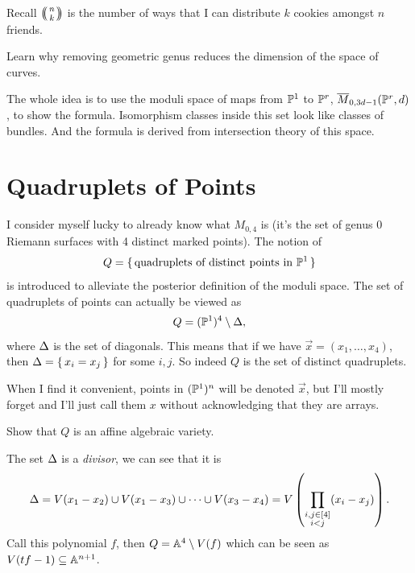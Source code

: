\documentclass[12pt]{memoir}
\begin{document}
\begin{Rmk}
    Recall $\multinom{n}{k}$ is the number of ways that I can distribute $k$ cookies amongst $n$ friends.
\end{Rmk}

\begin{Ej}
Learn why removing geometric genus reduces the dimension of the space of curves.
\end{Ej}

\begin{ptcb}
\end{ptcb}

The whole idea is to use the moduli space of maps from $\mathbb{P}^1$ to $\mathbb{P}^r$, $\overline M_{0,3d-1}(\mathbb{P}^r,d)$, to show the formula. Isomorphism classes inside this set look like classes of bundles. And the formula is derived from intersection theory of this space. 

\section{Quadruplets of Points}

I consider myself lucky to already know what $M_{0,4}$ is (it's the set of genus 0 Riemann surfaces with 4 distinct marked points). The notion of 
$$Q=\{\,\text{quadruplets of distinct points in }\mathbb{P}^1\,\}$$
is introduced to alleviate the posterior definition of the moduli space. The set of quadruplets of points can actually be viewed as 
$$Q=(\mathbb{P}^1)^4\setminus\Delta,$$
where $\Delta$ is the set of diagonals. This means that if we have $\vec x=(x_1,\dots,x_4)$, then $\Delta=\{\,x_i=x_j\,\}$ for some $i,j$. So indeed $Q$ is the set of distinct quadruplets. 

\begin{Rmk}
    When I find it convenient, points in $(\mathbb{P}^1)^n$ will be denoted $\vec x$, but I'll mostly forget and I'll just call them $x$ without acknowledging that they are arrays.
\end{Rmk}

\begin{Ej}
Show that $Q$ is an affine algebraic variety. 
\end{Ej}

\begin{ptcb}
    The set $\Delta$ is a \emph{divisor}, we can see that it is 
    $$\Delta=V(x_1-x_2)\cup V(x_1-x_3)\cup\cdots\cup V(x_3-x_4)=V\left(\prod_{\substack{i,j\in\left\lbrack4\right\rbrack\\ i<j}}(x_i-x_j)\right).$$
    Call this polynomial $f$, then $Q=\mathbb{A}^4\setminus V(f)$ which can be seen as $V(tf-1)\subseteq \mathbb{A}^{n+1}$.
    \end{ptcb}
\end{document}
